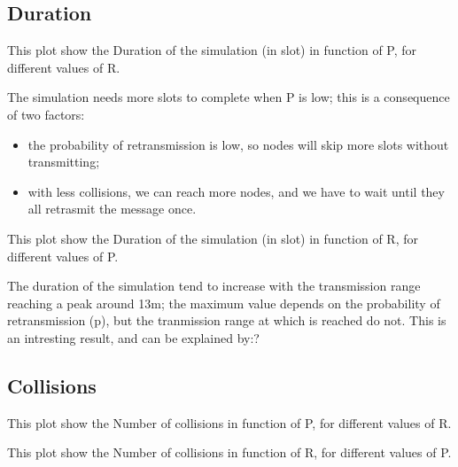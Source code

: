 \subsection{Duration}
This plot show the Duration of the simulation (in slot) in function of P, for different values of R.
\begin{figure}[H]
    \begin{center}
    \end{center}
    \vspace*{-1cm}
\end{figure}
The simulation needs more slots to complete when P is low; this is a consequence of two factors:%
\begin{itemize}
    \item the probability of retransmission is low, so nodes will skip more slots without transmitting;
    \item with less collisions, we can reach more nodes, and we have to wait until they all retrasmit the message once.
\end{itemize}
This plot show the Duration of the simulation (in slot) in function of R, for different values of P.
\begin{figure}[H]
    \begin{center}
    \end{center}
    \vspace*{-1cm}
\end{figure}
The duration of the simulation tend to increase with the transmission range reaching a peak around 13m; the maximum value 
depends on the probability of retransmission (p), but the tranmission range at which is reached do not. 
This is an intresting result, and can be explained by:?%
\subsection{Collisions}
This plot show the Number of collisions in function of P, for different values of R.
\begin{figure}[H]
    \begin{center}
    \end{center}
    \vspace*{-1cm}
\end{figure}
This plot show the Number of collisions in function of R, for different values of P.
\begin{figure}[H]
    \begin{center}
    \end{center}
    \vspace*{-1cm}
\end{figure}
